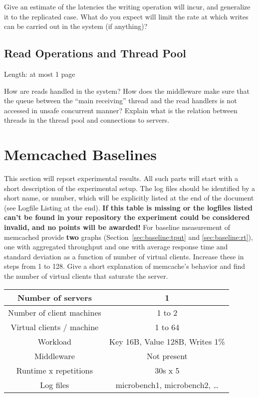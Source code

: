 \documentclass[11pt]{article}
\begin{document}
Give an estimate of the latencies the writing operation will incur, and generalize it to the replicated case. What do you expect will limit the rate at which writes can be carried out in the system (if anything)?

\subsection{Read Operations and Thread Pool}\label{sec:desc:reads}

Length: at most 1 page

How are reads handled in the system? How does the middleware make sure that the queue between the ``main receiving'' thread and the read handlers is not accessed in unsafe concurrent manner? Explain what is the relation between threads in the thread pool and connections to servers. 


\section{Memcached Baselines}\label{sec:baseline}

This section will report experimental results. All such parts will start with a short description of the experimental setup. The log files should be identified by a short name, or number, which will be explicitly listed at the end of the document (see Logfile Listing at the end).  \textbf{If this table is missing or the logfiles listed can't be found in your repository the experiment could be considered invalid, and no points will be awarded!}
For baseline measurement of memcached provide \textbf{two} graphs (Section~\ref{sec:baseline:tput} and \ref{sec:baseline:rt}), one with aggregated throughput and one with average response time and standard deviation as a function of number of virtual clients. Increase these in steps from 1 to 128. Give a short explanation of memcache's behavior and find the number of virtual clients that saturate the server.

\small{
\smallskip
\begin{tabular}{|c|c|}
\hline Number of servers & 1 \\ 
\hline Number of client machines & 1 to 2 \\ 
\hline Virtual clients / machine & 1 to 64 \\ 
\hline Workload & Key 16B, Value 128B, Writes 1\% \footnotemark \\
\hline Middleware & Not present \\ 
\hline Runtime x repetitions & 30s x 5 \\ 
\hline Log files & microbench1, microbench2, \ldots \\
\hline 
\end{tabular} }
\end{document}
